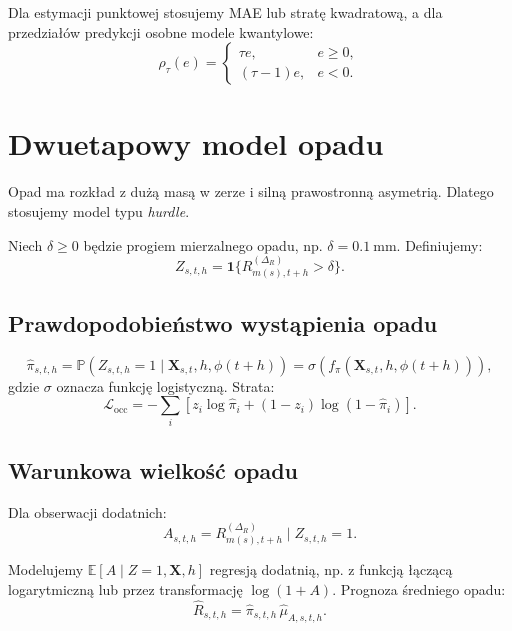 \documentclass[11pt,a4paper,oneside]{article}
\newcommand{\E}{\mathbb{E}}
\newcommand{\Prob}{\mathbb{P}}
\newcommand{\ind}{\mathbf{1}}
\newcommand{\Loss}{\mathcal{L}}
\newcommand{\X}{\mathbf{X}}
\begin{document}
Dla estymacji punktowej stosujemy MAE lub stratę kwadratową, a dla przedziałów
predykcji osobne modele kwantylowe:
\begin{equation}
  \rho_\tau(e)=
  \begin{cases}
    \tau e, & e\ge 0,\\
    (\tau-1)e, & e<0.
  \end{cases}
\end{equation}

\section{Dwuetapowy model opadu}

Opad ma rozkład z dużą masą w zerze i silną prawostronną asymetrią. Dlatego
stosujemy model typu \emph{hurdle}.

Niech $\delta\ge 0$ będzie progiem mierzalnego opadu, np.
$\delta=\SI{0.1}{\milli\meter}$. Definiujemy:
\begin{equation}
  Z_{s,t,h}=\ind\{R^{(\Delta_R)}_{m(s),t+h}>\delta\}.
\end{equation}

\subsection{Prawdopodobieństwo wystąpienia opadu}

\begin{equation}
  \widehat\pi_{s,t,h}
  =
  \Prob(Z_{s,t,h}=1\mid \X_{s,t},h,\phi(t+h))
  =
  \sigma\!\left(f_\pi(\X_{s,t},h,\phi(t+h))\right),
\end{equation}
gdzie $\sigma$ oznacza funkcję logistyczną. Strata:
\begin{equation}
  \Loss_{\mathrm{occ}}
  =
  -\sum_i
  \left[
    z_i\log\widehat\pi_i+
    (1-z_i)\log(1-\widehat\pi_i)
  \right].
\end{equation}

\subsection{Warunkowa wielkość opadu}

Dla obserwacji dodatnich:
\begin{equation}
  A_{s,t,h}=R^{(\Delta_R)}_{m(s),t+h}\mid Z_{s,t,h}=1.
\end{equation}

Modelujemy $\E[A\mid Z=1,\X,h]$ regresją dodatnią, np. z funkcją łączącą
logarytmiczną lub przez transformację $\log(1+A)$. Prognoza średniego opadu:
\begin{equation}
  \widehat R_{s,t,h}
  =
  \widehat\pi_{s,t,h}\,\widehat\mu_{A,s,t,h}.
  \label{eq:rain-expectation}
\end{equation}
\end{document}
